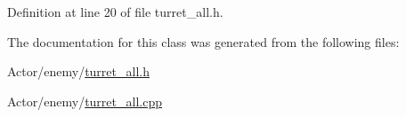 Definition at line 20 of file turret\+\_\+all.\+h.



The documentation for this class was generated from the following files\+:\begin{DoxyCompactItemize}
\item 
Actor/enemy/\hyperlink{turret__all_8h}{turret\+\_\+all.\+h}\item 
Actor/enemy/\hyperlink{turret__all_8cpp}{turret\+\_\+all.\+cpp}\end{DoxyCompactItemize}
